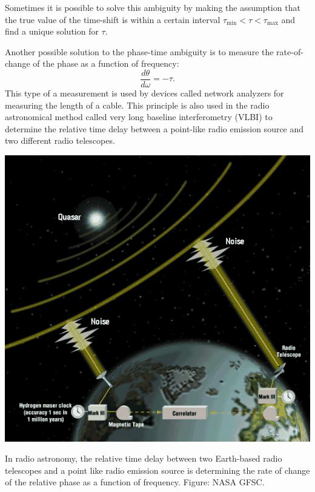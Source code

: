 Sometimes it is possible to solve this ambiguity by making the assumption that the true value of the time-shift is within a certain interval $\tau_{\mathrm{min}} < \tau < \tau_{\mathrm{max}}$ and find a unique solution for $\tau$.

Another possible solution to the phase-time ambiguity is to measure the rate-of-change of the phase as a function of frequency:
\begin{equation}
\frac{d\theta}{d\omega} = -\tau.
\end{equation}
This type of a measurement is used by devices called network analyzers for measuring the length of a cable. This principle is also used in the radio astronomical method called very long baseline interferometry (VLBI) to determine the relative time delay between a point-like radio emission source and two different radio telescopes.

\begin{marginfigure}
\begin{center}
\includegraphics[width=\textwidth]{ch06/figures/vlbi.png}
\end{center}
\caption{In radio astronomy, the relative time delay between two Earth-based radio telescopes and a point like radio emission source is determining the rate of change of the relative phase as a function of frequency. Figure: NASA GFSC.}
\label{fig:vlbi_concept}
\end{marginfigure}



